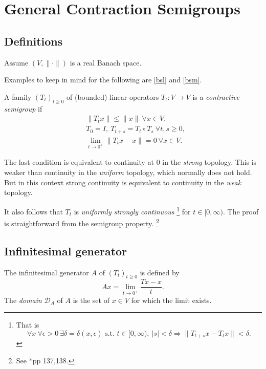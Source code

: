 \documentclass[a4paper]{amsart}
\theoremstyle{plain}
\theoremstyle{definition}
\theoremstyle{remark}
\begin{document}
\section{\textbf{General Contraction Semigroups}}

\subsection{Definitions}
Assume $ (V,\|\cdot\|) $ is a real Banach space.  

Examples to keep in mind for the following are \eqref{bsl} and \eqref{bsm}.

\medskip A family $ (T_t)_{t\geq 0} $ of (bounded) linear operators $ T_t:V \to V $ is a \emph{contractive semigroup} if 
\begin{equation} \label{}
\begin{aligned} 
&\|T_t x \| \leq \| x \| \ \forall x \in V,\\
& T_0 = I,\ T_{t+s} = T_t \circ T_s \ \forall t,s \geq 0,\\
&\lim_{t\to 0^+}\| T_t x - x \| =0\ \forall x \in V.
\end{aligned} 
\end{equation}



The last condition is equivalent to continuity at $ 0 $  in the \emph{strong} topology. This is weaker than continuity in the \emph{uniform} topology, which normally does not hold.  
But in this context strong continuity   is equivalent to continuity in the \emph{weak} topology.

It also follows that $ T_t $ is \emph{uniformly strongly continuous}%
\footnote{That is
\[
\forall x\ \forall \epsilon>0 \ \exists \delta = \delta(x,\epsilon) \text{ s.t. }
t \in [0,\infty),\ |s|< \delta \Longrightarrow  \|T_{t+s}x -T_t x \| < \delta .
 \]
}
for $ t\in [0,\infty) $. The proof is straightforward from the semigroup property.%
\footnote{See \cite{Lam}*{pp 137,138.}}

\subsection{Infinitesimal generator} The infinitesimal generator $ A $ of $ (T_t)_{t \geq 0} $ is  defined by
\begin{equation} \label{}
Ax = \lim_{t\to 0^+} \frac{Tx-x}{t}.
\end{equation} 
The \emph{domain} $ \mathcal{D} _A $ of $ A $ is the set of $ x \in V$ for which the limit exists.
\end{document}
